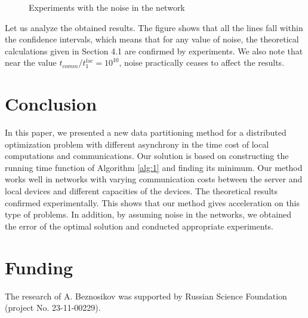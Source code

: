 \documentclass{article}
\theoremstyle{definition}
\theoremstyle{plain}
\begin{document}
\begin{figure}[h]
    \caption{Experiments with the noise in the network}
    \label{ris:image2}
\end{figure}

Let us analyze the obtained results. The figure shows that all the lines fall within the confidence intervals, which means that for any value of noise, the theoretical calculations given in Section 4.1 are confirmed by experiments. We also note that near the value $t_{comm}/t_1^{loc} = 10^{10}$, noise practically ceases to affect the results.

\section{Conclusion}

In this paper, we presented a new data partitioning method for a distributed optimization problem with different asynchrony in the time cost of local computations and communications. Our solution is based on constructing the running time function of Algorithm \ref{alg:1} and finding its minimum. Our method works well in networks with varying communication costs between the server and local devices and different capacities of the devices. The theoretical results confirmed experimentally. This shows that our method gives acceleration on this type of problems. In addition, by assuming noise in the networks, we obtained the error of the optimal solution and conducted appropriate experiments.

\section*{Funding}
The research of A. Beznosikov was supported by Russian Science Foundation (project No. 23-11-00229).

\printbibliography[heading=bibintoc,title={References}]
\end{document}
